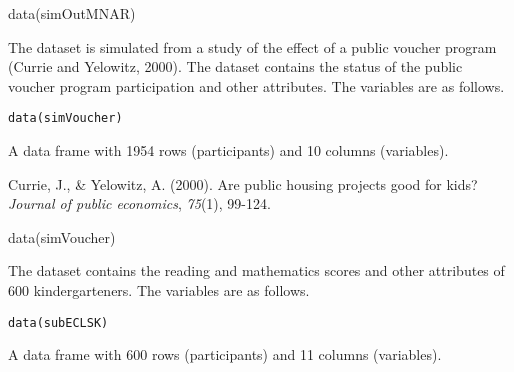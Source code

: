 \documentclass[a4paper]{book}
\begin{document}
%
\begin{Examples}
\begin{ExampleCode}

data(simOutMNAR)


\end{ExampleCode}
\end{Examples}
%
\begin{Description}\relax
The dataset is simulated from a study of the effect of a public voucher program
(Currie and Yelowitz, 2000). The dataset contains the status of the public voucher program
participation and other attributes. The variables are as follows.
\end{Description}
%
\begin{Usage}
\begin{verbatim}
data(simVoucher)
\end{verbatim}
\end{Usage}
%
\begin{Format}
A data frame with 1954 rows (participants) and 10 columns (variables).
\end{Format}
%
\begin{References}\relax
Currie, J., \& Yelowitz, A. (2000).
Are public housing projects good for kids? \emph{Journal of public economics},
\emph{75}(1), 99-124.
\end{References}
%
\begin{Examples}
\begin{ExampleCode}

data(simVoucher)


\end{ExampleCode}
\end{Examples}
%
\begin{Description}\relax
The dataset contains the reading and mathematics scores and other attributes of
600 kindergarteners. The variables are as follows.
\end{Description}
%
\begin{Usage}
\begin{verbatim}
data(subECLSK)
\end{verbatim}
\end{Usage}
%
\begin{Format}
A data frame with 600 rows (participants) and 11 columns (variables).
\end{Format}
\end{document}
